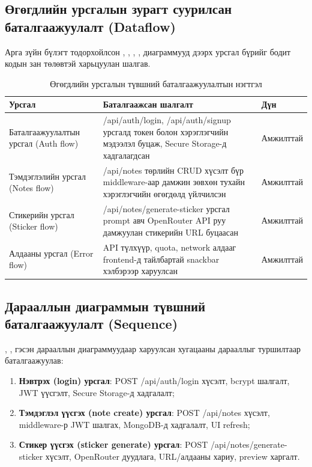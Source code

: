\subsection{Өгөгдлийн урсгалын зурагт суурилсан баталгаажуулалт (Dataflow)}
\label{subsec:dataflow_validation}

Арга зүйн бүлэгт тодорхойлсон , , , ,  диаграммууд дээрх урсгал бүрийг бодит кодын зан төлөвтэй харьцуулан шалгав.

\begin{table}[H]
\centering
\caption{Өгөгдлийн урсгалын түвшний баталгаажуулалтын нэгтгэл}
\label{tab:dataflow_validation}
\begin{tabular}{>{\raggedright\arraybackslash}p{3.8cm}>{\raggedright\arraybackslash}p{6.5cm}>{\raggedright\arraybackslash}p{2.8cm}}
\toprule
\textbf{Урсгал} & \textbf{Баталгаажсан шалгалт} & \textbf{Дүн} \\
\midrule
Баталгаажуулалтын урсгал (Auth flow) & /api/auth/login, /api/auth/signup урсгалд токен болон хэрэглэгчийн мэдээлэл буцаж, Secure Storage-д хадгалагдсан & Амжилттай \\
Тэмдэглэлийн урсгал (Notes flow) & /api/notes төрлийн CRUD хүсэлт бүр middleware-аар дамжин зөвхөн тухайн хэрэглэгчийн өгөгдөлд үйлчилсэн & Амжилттай \\
Стикерийн урсгал (Sticker flow) & /api/notes/generate-sticker урсгал prompt авч OpenRouter API руу дамжуулан стикерийн URL буцаасан & Амжилттай \\
Алдааны урсгал (Error flow) & API түлхүүр, quota, network алдааг frontend-д тайлбартай snackbar хэлбэрээр харуулсан & Амжилттай \\
\bottomrule
\end{tabular}
\end{table}

\subsection{Дарааллын диаграммын түвшний баталгаажуулалт (Sequence)}
\label{subsec:sequence_validation}

, ,  гэсэн дарааллын диаграммуудаар харуулсан хугацааны дарааллыг туршилтаар баталгаажуулав:

\begin{enumerate}
    \item \textbf{Нэвтрэх (login) урсгал}: POST /api/auth/login хүсэлт, bcrypt шалгалт, JWT үүсгэлт, Secure Storage-д хадгалалт;
    \item \textbf{Тэмдэглэл үүсгэх (note create) урсгал}: POST /api/notes хүсэлт, middleware-р JWT шалгах, MongoDB-д хадгалалт, UI refresh;
    \item \textbf{Стикер үүсгэх (sticker generate) урсгал}: POST /api/notes/generate-sticker хүсэлт, OpenRouter дуудлага, URL/алдааны хариу, preview харгалт.
\end{enumerate}

